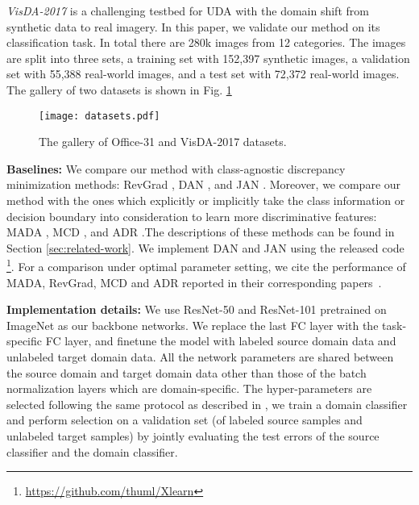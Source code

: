 \documentclass[10pt,twocolumn,letterpaper]{article}
\begin{document}
\noindent\emph{VisDA-2017} \cite{peng2017visda} is a challenging testbed for UDA 
with the domain shift from synthetic data to real imagery.
In this paper, we validate our method on its classification task.
In total there are 280k images from 12 categories.
The images are split into three sets, \ie a training set with 152,397 synthetic images,
a validation set with 55,388 real-world images,
and a test set with 72,372 real-world images.
The gallery of two datasets is shown in Fig. \ref{fig:gallery}
\begin{figure}[t]
\texttt{[image: datasets.pdf]}
\caption{\label{fig:gallery}
The gallery of Office-31 and VisDA-2017 datasets.
}
\vspace{-5mm}
\end{figure}

\noindent \textbf{Baselines:}
We compare our method with class-agnostic discrepancy minimization methods:
RevGrad \cite{ganin2014unsupervised,ganin2016domain}, DAN \cite{long2015learning}, and 
JAN \cite{long2017deep}. Moreover, we compare our method with the ones which explicitly or implicitly 
take the class information or decision boundary into consideration to learn 
more discriminative features: MADA \cite{pei2018multi}, MCD \cite{saito2017maximum}, 
and ADR \cite{saito2017adversarial}.The descriptions of these methods can be found in 
Section \ref{sec:related-work}.
We implement DAN and JAN using the released code \footnote{\url{https://github.com/thuml/Xlearn}}.
For a comparison under optimal parameter setting, we cite the performance of MADA, RevGrad, MCD and ADR reported in their corresponding papers~\cite{pei2018multi,saito2017adversarial,saito2017maximum,ganin2014unsupervised}.









\noindent\textbf{Implementation details:} We use ResNet-50 and ResNet-101 \cite{he2016deep,he2016identity} pretrained on ImageNet \cite{deng2009imagenet} as our backbone networks. 
We replace the last FC layer with the task-specific FC layer,
and finetune the model with labeled source domain data and unlabeled target domain data.
All the network parameters are shared between the source domain and target domain data
other than those of the batch normalization layers which are domain-specific.
The hyper-parameters are selected following the same protocol as described in \cite{long2015learning}, \ie we train a domain classifier and perform selection on a validation set (of labeled source samples and unlabeled target samples)
by jointly evaluating the test errors of the source classifier and the domain classifier. 
\end{document}

